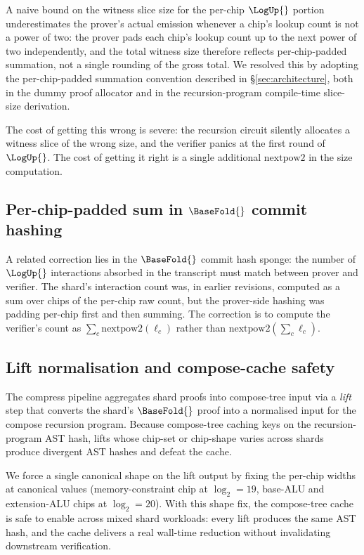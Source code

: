 A naive bound on the witness slice size for the per-chip $\LogUp{}$ portion underestimates the prover's actual emission whenever a chip's lookup count is not a power of two: the prover pads each chip's lookup count up to the next power of two independently, and the total witness size therefore reflects per-chip-padded summation, not a single rounding of the gross total. We resolved this by adopting the per-chip-padded summation convention described in \S\ref{sec:architecture}, both in the dummy proof allocator and in the recursion-program compile-time slice-size derivation.

The cost of getting this wrong is severe: the recursion circuit silently allocates a witness slice of the wrong size, and the verifier panics at the first round of $\LogUp{}$. The cost of getting it right is a single additional $\mathrm{nextpow2}$ in the size computation.

\subsection{Per-chip-padded sum in $\BaseFold{}$ commit hashing}

A related correction lies in the $\BaseFold{}$ commit hash sponge: the number of $\LogUp{}$ interactions absorbed in the transcript must match between prover and verifier. The shard's interaction count was, in earlier revisions, computed as a sum over chips of the per-chip raw count, but the prover-side hashing was padding per-chip first and then summing. The correction is to compute the verifier's count as $\sum_c \mathrm{nextpow2}(\ell_c)$ rather than $\mathrm{nextpow2}(\sum_c \ell_c)$.

\subsection{Lift normalisation and compose-cache safety}
\label{sec:lift-normalization}

The compress pipeline aggregates shard proofs into compose-tree input via a \emph{lift} step that converts the shard's $\BaseFold{}$ proof into a normalised input for the compose recursion program. Because compose-tree caching keys on the recursion-program AST hash, lifts whose chip-set or chip-shape varies across shards produce divergent AST hashes and defeat the cache.

We force a single canonical shape on the lift output by fixing the per-chip widths at canonical values (memory-constraint chip at $\log_2 = 19$, base-ALU and extension-ALU chips at $\log_2 = 20$). With this shape fix, the compose-tree cache is safe to enable across mixed shard workloads: every lift produces the same AST hash, and the cache delivers a real wall-time reduction without invalidating downstream verification.

